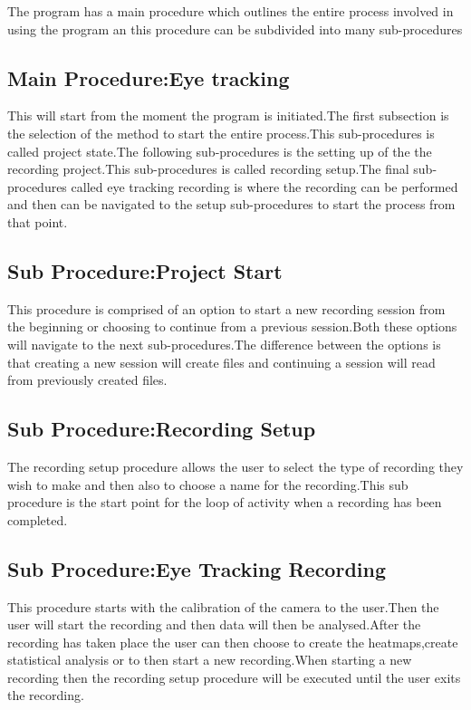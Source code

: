 The program has a main procedure which outlines the entire process involved in using the program an this procedure can be subdivided into many sub-procedures
\subsection{Main Procedure:Eye tracking}
This will start from the moment the program is initiated.The first subsection is the selection of the method to start the entire process.This sub-procedures is called project state.The following sub-procedures is the setting up of the the recording project.This sub-procedures is called recording setup.The final sub-procedures called eye tracking recording is where the recording can be performed and then can be navigated to the setup sub-procedures to start the process from that point.
\subsection{Sub Procedure:Project Start}
This procedure is comprised of an option to start a new recording session from the beginning or choosing to continue from a previous session.Both these options will navigate to the next sub-procedures.The difference between the options is that creating a new session will create files and continuing a session will read from previously created files. 
\subsection{Sub Procedure:Recording Setup}
The recording setup procedure allows the user to select the type of recording they wish to make and then also to choose a name for the recording.This sub procedure is the start point for the loop of activity when a recording has been completed.
\subsection{Sub Procedure:Eye Tracking Recording}
This procedure starts with the calibration of the camera to the user.Then the user will start the recording and then data will then be analysed.After the recording has taken place the user can then choose to create the heatmaps,create statistical analysis or to then start a new recording.When starting a new recording then the recording setup procedure will be executed until the user exits the recording. 
